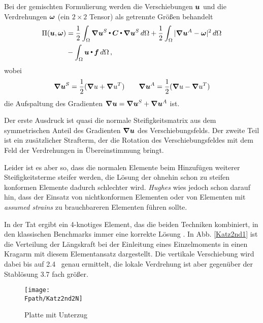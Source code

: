 Bei der gemischten Formulierung werden die Verschiebungen $\mbox{\boldmath $u$}$ und die Verdrehungen $\mbox{\boldmath $\omega$}$ (ein $2 \times 2$ Tensor) als getrennte Gr\"{o}{\ss}en behandelt
\begin{align}\label{Eq19}
\Pi(\mbox{\boldmath $u$}, \mbox{\boldmath $\omega$}) &= \frac{1}{2} \int_{\Omega} \mbox{\boldmath $\nabla$} \mbox{\boldmath $u$}^S {\,\scriptscriptstyle \stackrel{\bullet}{{}}}\, \mbox{\boldmath $C$} {\,\scriptscriptstyle \stackrel{\bullet}{{}}}\,  \mbox{\boldmath $\nabla$} \mbox{\boldmath $u$}^S\,d\Omega + \frac{1}{2} \int_{\Omega} | \mbox{\boldmath $\nabla$} \mbox{\boldmath $u$}^A- \mbox{\boldmath $\omega$}|^2 \,d\Omega \nonumber \\ &- \int_{\Omega} \mbox{\boldmath $u$} {\,\scriptscriptstyle \stackrel{\bullet}{{}}}\, \mbox{\boldmath $f$} \,d\Omega\,,
\end{align}
wobei
\begin{align}
\mbox{\boldmath $\nabla$} \mbox{\boldmath $u$}^S = \frac{1}{2} (\mbox{\boldmath $\nabla$} u + \mbox{\boldmath $\nabla$} u^T) \qquad \mbox{\boldmath $\nabla$} \mbox{\boldmath $u$}^A = \frac{1}{2} (\mbox{\boldmath $\nabla$} u - \mbox{\boldmath $\nabla$} u^T)
\end{align}
die Aufspaltung des Gradienten $\mbox{\boldmath $\nabla$} \mbox{\boldmath $u$} = \mbox{\boldmath $\nabla$} \mbox{\boldmath $u$}^S + \mbox{\boldmath $\nabla$} \mbox{\boldmath $u$}^A$ ist.

Der erste Ausdruck ist quasi die normale Steifigkeitsmatrix aus dem symmetrischen Anteil des Gradienten $\mbox{\boldmath $\nabla$} \mbox{\boldmath $u$}$ des Verschiebungsfelds. Der zweite Teil ist ein zus\"{a}tzlicher Strafterm, der die Rotation des Verschiebungsfeldes mit dem Feld der Verdrehungen in \"{U}bereinstimmung bringt.

Leider ist es aber so, dass die normalen Elemente beim Hinzuf\"{u}gen weiterer Steifigkeitsterme steifer werden, die L\"{o}sung der ohnehin schon zu steifen konformen Elemente dadurch schlechter wird. {\em Hughes\/} wies jedoch schon darauf hin, dass der Einsatz von nichtkonformen Elementen oder von Elementen mit {\em assumed strains\/} zu brauchbareren Elementen f\"{u}hren sollte.

In der Tat ergibt ein 4-knotiges Element, das die beiden Techniken kombiniert, in den klassischen Benchmarks immer eine korrekte L\"{o}sung \cite{Pimpinelli}. In Abb. \ref{Katz2nd1} ist die Verteilung der L\"{a}ngskraft bei der Einleitung eines Einzelmoments in einen Kragarm mit diesem Elementansatz dargestellt. Die vertikale Verschiebung wird dabei bis auf  2.4 \permil\ genau ermittelt, die lokale Verdrehung ist aber gegen\"{u}ber der Stabl\"{o}sung 3.7 fach gr\"{o}{\ss}er.

\begin{figure}[tbp] \centering
\centering
\if {} \sidecaption[t] \fi
\texttt{[image: \\Fpath/Katz2nd2N]}
\caption{Platte mit Unterzug} \label{Katz2nd2}
\end{figure}%

